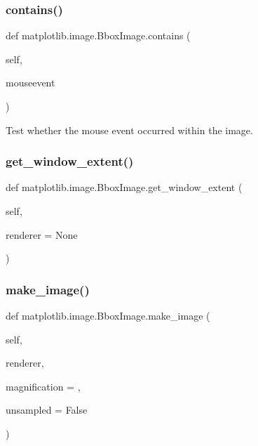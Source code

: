 \subsubsection{\texorpdfstring{contains()}{contains()}}
{\footnotesize\ttfamily def matplotlib.\+image.\+Bbox\+Image.\+contains (\begin{DoxyParamCaption}\item[{}]{self,  }\item[{}]{mouseevent }\end{DoxyParamCaption})}

\begin{DoxyVerb}Test whether the mouse event occurred within the image.\end{DoxyVerb}
 \mbox{\label{classmatplotlib_1_1image_1_1BboxImage_ae888c54fcab1ca0f6848d01dd3faa0c1}} 
\subsubsection{\texorpdfstring{get\+\_\+window\+\_\+extent()}{get\_window\_extent()}}
{\footnotesize\ttfamily def matplotlib.\+image.\+Bbox\+Image.\+get\+\_\+window\+\_\+extent (\begin{DoxyParamCaption}\item[{}]{self,  }\item[{}]{renderer = {\ttfamily None} }\end{DoxyParamCaption})}

\mbox{\label{classmatplotlib_1_1image_1_1BboxImage_ab578b9ce6e7deaa7d77d02c9a2883c2f}} 
\subsubsection{\texorpdfstring{make\+\_\+image()}{make\_image()}}
{\footnotesize\ttfamily def matplotlib.\+image.\+Bbox\+Image.\+make\+\_\+image (\begin{DoxyParamCaption}\item[{}]{self,  }\item[{}]{renderer,  }\item[{}]{magnification = {},  }\item[{}]{unsampled = {\ttfamily False} }\end{DoxyParamCaption})}



